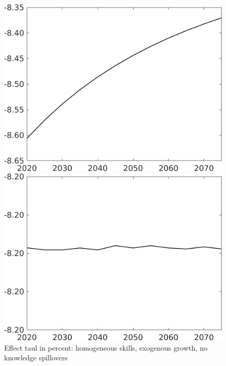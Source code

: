 \documentclass[12pt]{article}
\begin{document}
\begin{figure}[h!!]
	\centering
	\caption{Effect taul in percent: homogeneous skills, exogenous growth, no knowledge spillovers }\label{fig:LF_BAU_nsk1_xgr1_noknow}
	\begin{minipage}[]{0.32\textwidth}
		\includegraphics[width=1\textwidth]{../../codding_model/own_basedOnFried/optimalPol_010922_revision/figures/all_13Sept22/CompTaul_LFBAUPer_Reg0_Emnet_spillover0_nsk1_xgr1_knspil1_sep1_countec0_GovRev0_etaa0.79.png}
	\end{minipage}	
	\begin{minipage}[]{0.32\textwidth}
		\includegraphics[width=1\textwidth]{../../codding_model/own_basedOnFried/optimalPol_010922_revision/figures/all_13Sept22/CompTaul_LFBAUPer_Reg0_hh_spillover0_nsk1_xgr1_knspil1_sep1_countec0_GovRev0_etaa0.79.png}

\end{minipage}
\end{figure}
\end{document}
